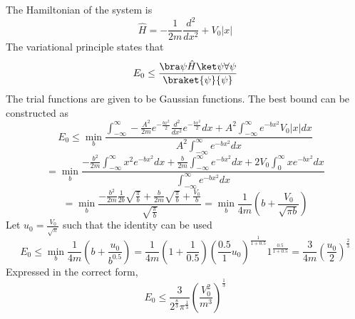 \begin{sol}
The Hamiltonian of the system is 
$$\hat H=-\frac{1}{2m}\frac{d^2}{dx^2}+V_0|x|$$
The variational principle states that
$$E_0\leq\frac{\bra\psi\hat H\ket\psi\forall\psi}{\braket{\psi}{\psi}}$$
The trial functions are given to be Gaussian functions. The best bound can be constructed as
$$E_0\leq\min_{b}\frac{\int_{-\infty}^\infty -\frac{A^2}{2m}e^{-\frac{bx^2}{2}}\frac{d^2}{dx^2}e^{-\frac{bx^2}{2}}dx+A^2\int_{-\infty}^\infty e^{-bx^2}V_0|x|dx}{A^2\int_{-\infty}^\infty e^{-bx^2}dx}$$
$$=\min_b\frac{-\frac{b^2}{2m}\int_{-\infty}^\infty x^2e^{-bx^2}dx+\frac{b}{2m}\int_{-\infty}^\infty e^{-bx^2}dx+2V_0\int_0^\infty xe^{-bx^2}dx}{\int_{-\infty}^\infty e^{-bx^2}dx}$$
$$=\min_b\frac{-\frac{b^2}{2m}\frac{1}{2b}\sqrt{\frac{\pi}{b}}+\frac{b}{2m}\sqrt{\frac{\pi}{b}}+\frac{V_0}{b}}{\sqrt{\frac{\pi}{b}}}=\min_b \frac{1}{4m}\left(b+\frac{V_0}{\sqrt{\pi b}}\right)$$
Let $u_0=\frac{V_0}{\sqrt{\pi}}$ such that the identity can be used
$$E_0\leq\min_b\frac{1}{4m}\left(b+\frac{u_0}{b^{0.5}}\right)=\frac{1}{4m}(1+\frac{1}{0.5})(\frac{0.5}{1}u_0)^{\frac{1}{1+0.5}}1^{\frac{0.5}{1+0.5}}=\frac{3}{4m}\left(\frac{u_0}{2}\right)^\frac{2}{3}$$
Expressed in the correct form,
$$E_0\leq \frac{3}{2^\frac{8}{3}\pi^\frac{1}{3}}\left(\frac{V_0^2}{m^3}\right)^\frac{1}{3}$$
\end{sol}